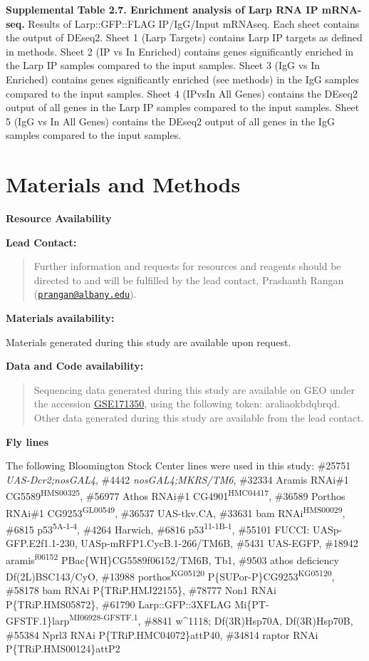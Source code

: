 \documentclass[12pt,oneside]{reedthesis}
\begin{document}
\textbf{\hfill\break
}

\textbf{Supplemental Table 2.7. Enrichment analysis of Larp RNA IP mRNA-seq.}
Results of Larp::GFP::FLAG IP/IgG/Input mRNAseq. Each sheet
contains the output of DEseq2. Sheet 1 (Larp Targets) contains Larp IP
targets as defined in methods. Sheet 2 (IP vs In Enriched) contains
genes significantly enriched in the Larp IP samples compared to the
input samples. Sheet 3 (IgG vs In Enriched) contains genes significantly
enriched (see methods) in the IgG samples compared to the input samples.
Sheet 4 (IPvsIn All Genes) contains the DEseq2 output of all genes in
the Larp IP samples compared to the input samples. Sheet 5 (IgG vs In
All Genes) contains the DEseq2 output of all genes in the IgG samples
compared to the input samples.

\hypertarget{materials-and-methods}{%
\section{Materials and Methods}\label{materials-and-methods}}

\textbf{Resource Availability}

\textbf{Lead Contact:}
\begin{quote}
Further information and requests for resources and reagents should be
directed to and will be fulfilled by the lead contact, Prashanth
Rangan (\href{mailto:prangan@albany.edu}{\nolinkurl{prangan@albany.edu}}).
\end{quote}
\textbf{Materials availability:}

Materials generated during this study are available upon request.

\textbf{Data and Code availability:}
\begin{quote}
Sequencing data generated during this study are available on GEO under
the accession
\href{https://www.ncbi.nlm.nih.gov/geo/query/acc.cgi?acc=GSE171350}{GSE171350},
using the following token: araliaokbdqbrqd. Other data generated
during this study are available from the lead contact.
\end{quote}
\textbf{Fly lines}

The following Bloomington Stock Center lines were used in this study:
\#25751 \emph{UAS-Dcr2;nosGAL4}, \#4442 \emph{nosGAL4;MKRS/TM6}, \#32334 Aramis
RNAi\#1 CG5589\textsuperscript{HMS00325}, \#56977 Athos RNAi\#1 CG4901\textsuperscript{HMC04417},
\#36589 Porthos RNAi\#1 CG9253\textsuperscript{GL00549}, \#36537 UAS-tkv.CA, \#33631 bam
RNAi\textsuperscript{HMS00029}, \#6815 p53\textsuperscript{5A-1-4}, \#4264 Harwich, \#6816 p53\textsuperscript{11-1B-1},
\#55101 FUCCI: UASp-GFP.E2f1.1-230, UASp-mRFP1.CycB.1-266/TM6B, \#5431
UAS-EGFP, \#18942 aramis\textsuperscript{f06152} PBac\{WH\}CG5589f06152/TM6B, Tb1, \#9503
athos deficiency Df(2L)BSC143/CyO, \#13988 porthos\textsuperscript{KG05120}
P\{SUPor-P\}CG9253\textsuperscript{KG05120}, \#58178 bam RNAi P\{TRiP.HMJ22155\}, \#78777
Non1 RNAi P\{TRiP.HMS05872\}, \#61790 Larp::GFP::3XFLAG
Mi\{PT-GFSTF.1\}larp\textsuperscript{MI06928-GFSTF.1}, \#8841 w\^{}1118; Df(3R)Hsp70A,
Df(3R)Hsp70B, \#55384 Nprl3 RNAi P\{TRiP.HMC04072\}attP40, \#34814 raptor
RNAi P\{TRiP.HMS00124\}attP2
\end{document}
